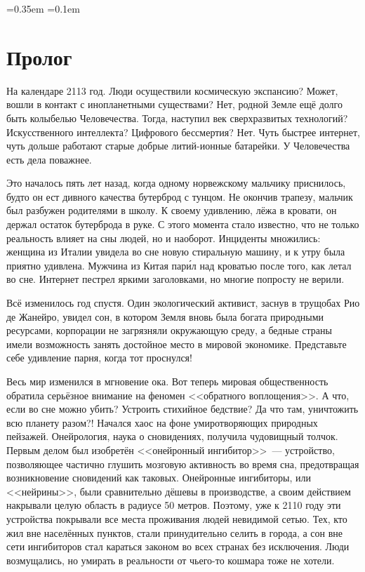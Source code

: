 \documentclass[openany, oneside]{book}
\begin{document}
\font=0.35em
\font=0.1em

\chapter*{Пролог}
На календаре 2113 год. Люди осуществили космическую экспансию? Может, вошли в контакт с инопланетными существами? Нет, родной Земле ещё долго быть колыбелью Человечества. Тогда, наступил век сверхразвитых технологий? Искусственного интеллекта? Цифрового бессмертия? Нет. Чуть быстрее интернет, чуть дольше работают старые добрые литий-ионные батарейки. У Человечества есть дела поважнее.

Это началось пять лет назад, когда одному норвежскому мальчику приснилось, будто он ест дивного качества бутерброд с тунцом. Не окончив трапезу, мальчик был разбужен родителями в школу. К своему удивлению, лёжа в кровати, он держал остаток бутерброда в руке. С этого момента стало известно, что не только реальность влияет на сны людей, но и наоборот. Инциденты множились: женщина из Италии увидела во сне новую стиральную машину, и к утру была приятно удивлена. Мужчина из Китая пар\'{и}л над кроватью после того, как летал во сне. Интернет пестрел яркими заголовками, но многие попросту не верили.

Всё изменилось год спустя. Один экологический активист, заснув в трущобах Рио де Жанейро, увидел сон, в котором Земля вновь была богата природными ресурсами, корпорации не загрязняли окружающую среду, а бедные страны имели возможность занять достойное место в мировой экономике. Представьте себе удивление парня, когда тот проснулся!

Весь мир изменился в мгновение ока. Вот теперь мировая общественность обратила серьёзное внимание на феномен <<обратного воплощения>>. А что, если во сне можно убить? Устроить стихийное бедствие? Да что там, уничтожить всю планету разом?! Начался хаос на фоне умиротворяющих природных пейзажей. Онейрология, наука о сновидениях, получила чудовищный толчок. Первым делом был изобретён <<онейронный ингибитор>>~--- устройство, позволяющее частично глушить мозговую активность во время сна, предотвращая возникновение сновидений как таковых. Онейронные ингибиторы, или <<нейрины>>, были сравнительно дёшевы в производстве, а своим действием накрывали целую область в радиусе 50 метров. Поэтому, уже к 2110 году эти устройства покрывали все места проживания людей невидимой сетью. Тех, кто жил вне населённых пунктов, стали принудительно селить в города, а сон вне сети ингибиторов стал караться законом во всех странах без исключения. Люди возмущались, но умирать в реальности от чьего-то кошмара тоже не хотели.
\end{document}
